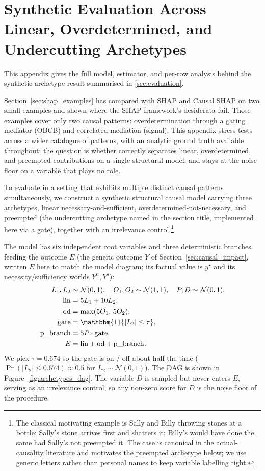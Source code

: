 \section{Synthetic Evaluation Across Linear, Overdetermined, and Undercutting Archetypes}
\label{sub:synthetic}

This appendix gives the full model, estimator, and per-row analysis behind the synthetic-archetype result summarised in \cref{sec:evaluation}.

Section~\ref{sec:shap_examples} has compared \ourapproach
with SHAP and Causal SHAP on two small examples and shown where the SHAP
framework's desiderata fail. Those examples cover only two causal patterns:
overdetermination through a gating mediator (OBCB) and correlated mediation
(signal). This appendix stress-tests \ourapproach across a wider catalogue of
patterns, with an analytic ground truth available throughout: the question is
whether \ourapproach correctly separates linear, overdetermined, and preempted
contributions on a single structural model, and stays at the noise floor on a
variable that plays no role.

To evaluate \ourapproach in a setting that exhibits multiple distinct causal patterns
simultaneously, we construct a synthetic structural causal model carrying three archetypes,
linear necessary-and-sufficient, overdetermined-not-necessary, and preempted
(the undercutting archetype named in the section title, implemented here via a
gate),
together with an irrelevance control.\footnote{The classical motivating example is
Sally and Billy throwing stones at a bottle: Sally's stone arrives first and shatters it;
Billy's would have done the same had Sally's not preempted it. The case is canonical in
the actual-causality literature \citep{actualCausalityHalpern} and motivates the preempted
archetype below; we use generic letters rather than personal names to keep variable
labelling tight.}

The model has six independent root variables and three deterministic branches feeding the
outcome $E$ (the generic outcome $Y$ of Section~\ref{sec:causal_impact}, written $E$
here to match the model diagram; its factual value is $y^\star$ and its
necessity/sufficiency worlds $Y^n, Y^s$):
\begin{align*}
L_1, L_2 &\sim \mathcal{N}(0, 1), \quad O_1, O_2 \sim \mathcal{N}(1, 1), \quad
  P, D \sim \mathcal{N}(0, 1), \\
\mathrm{lin}      &= 5 L_1 + 10 L_2, \\
\mathrm{od}       &= \max(5 O_1,\, 5 O_2), \\
\mathrm{gate}     &= \mathbbm{1}\{\lvert L_2 \rvert \le \tau\}, \\
\mathrm{p\_branch}&= 5 P \cdot \mathrm{gate}, \\
E &= \mathrm{lin} + \mathrm{od} + \mathrm{p\_branch}.
\end{align*}
We pick $\tau = 0.674$ so the gate is on / off about half the time
($\Pr(\lvert L_2 \rvert \le 0.674) \approx 0.5$ for $L_2 \sim \mathcal{N}(0,1)$).
The DAG is shown in Figure~\ref{fig:archetypes_dag}. The variable $D$ is sampled but never
enters $E$, serving as an irrelevance control, so any non-zero score for $D$ is the
noise floor of the procedure.

